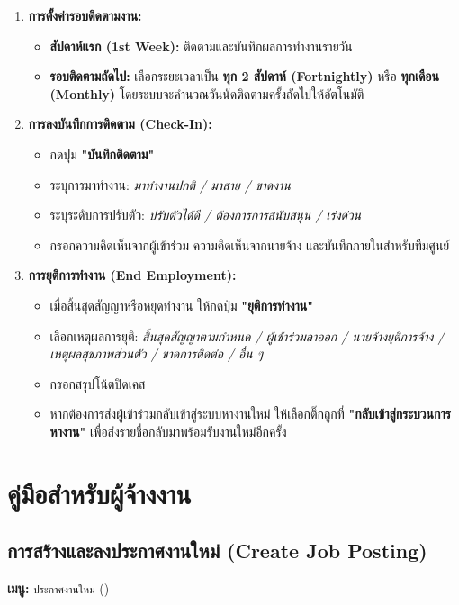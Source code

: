 \documentclass[12pt,a4paper]{report}
\newcommand{\codeinline}[1]{{\ttfamily\path{#1}}}
\begin{document}
\begin{enumerate}
    \item \textbf{การตั้งค่ารอบติดตามงาน:}
    \begin{itemize}
        \item \textbf{สัปดาห์แรก (1st Week):} ติดตามและบันทึกผลการทำงานรายวัน
        \item \textbf{รอบติดตามถัดไป:} เลือกระยะเวลาเป็น \textbf{ทุก 2 สัปดาห์ (Fortnightly)} หรือ \textbf{ทุกเดือน (Monthly)} โดยระบบจะคำนวณวันนัดติดตามครั้งถัดไปให้อัตโนมัติ
    \end{itemize}

    \item \textbf{การลงบันทึกการติดตาม (Check-In):}
    \begin{itemize}
        \item กดปุ่ม \textbf{"บันทึกติดตาม"}
        \item ระบุการมาทำงาน: \textit{มาทำงานปกติ / มาสาย / ขาดงาน}
        \item ระบุระดับการปรับตัว: \textit{ปรับตัวได้ดี / ต้องการการสนับสนุน / เร่งด่วน}
        \item กรอกความคิดเห็นจากผู้เข้าร่วม ความคิดเห็นจากนายจ้าง และบันทึกภายในสำหรับทีมศูนย์
    \end{itemize}

    \item \textbf{การยุติการทำงาน (End Employment):}
    \begin{itemize}
        \item เมื่อสิ้นสุดสัญญาหรือหยุดทำงาน ให้กดปุ่ม \textbf{"ยุติการทำงาน"}
        \item เลือกเหตุผลการยุติ: \textit{สิ้นสุดสัญญาตามกำหนด / ผู้เข้าร่วมลาออก / นายจ้างยุติการจ้าง / เหตุผลสุขภาพส่วนตัว / ขาดการติดต่อ / อื่น ๆ}
        \item กรอกสรุปโน้ตปิดเคส
        \item หากต้องการส่งผู้เข้าร่วมกลับเข้าสู่ระบบหางานใหม่ ให้เลือกติ๊กถูกที่ \textbf{"กลับเข้าสู่กระบวนการหางาน"} เพื่อส่งรายชื่อกลับมาพร้อมรับงานใหม่อีกครั้ง
    \end{itemize}
\end{enumerate}

\chapter{คู่มือสำหรับผู้จ้างงาน}

\section{การสร้างและลงประกาศงานใหม่ (Create Job Posting)}
\textbf{เมนู:} \texttt{ประกาศงานใหม่} (\codeinline{/employer/create-job})
\end{document}
